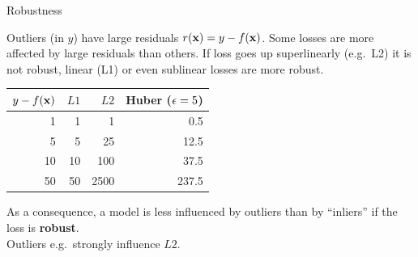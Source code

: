 \documentclass[11pt,compress,t,notes=noshow, xcolor=table]{beamer}
\begin{document}
\begin{vbframe}{Robustness}

\small

Outliers (in $y$) have large residuals $r(\mathbf{x}) = y - f(\mathbf{x})$. Some losses are more
affected by large residuals than others. If loss goes up superlinearly (e.g.\ L2) it is not robust, linear (L1) or even sublinear losses are more robust.

\vspace{0.5cm}

\begin{minipage}[c]{0.5\textwidth}
  \footnotesize
  \begin{table}[]
  \begin{tabular}{r|r|r|r}
  \toprule
  $y - f(\mathbf{x})$ & $L1$ & $L2$ & Huber ($\epsilon = 5$) \\ \hline
  1 & 1 & 1 & 0.5 \\
  5 & 5 & 25 & 12.5 \\
  10 & 10 & 100 & 37.5 \\
  50 & 50 & 2500  & 237.5
\end{tabular}
\end{table}
\end{minipage}%
\begin{minipage}[c]{0.05\textwidth}
  \phantom{foo}
\end{minipage}%
\begin{minipage}[c]{0.45\textwidth}
  \small
  As a consequence, a model is less influenced by outliers than by ``inliers'' if 
  the loss is \textbf{robust}.\\
  Outliers e.g.\ strongly influence $L2$.
\end{minipage}%

\vfill



\end{vbframe}
\end{document}
